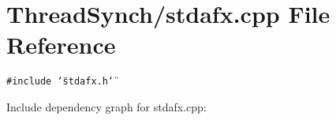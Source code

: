 \section{Thread\-Synch/stdafx.cpp File Reference}
\label{stdafx_8cpp}
{\tt \#include \char`\"{}stdafx.h\char`\"{}}\par


Include dependency graph for stdafx.cpp: